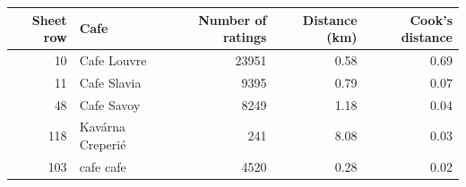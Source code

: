 \begingroup\footnotesize
\begin{tabular}{rlrrr}
  \toprule
Sheet row & Cafe & Number of ratings & Distance (km) & Cook's distance \\ 
  \midrule
 10 & Cafe Louvre & 23951 & 0.58 & 0.69 \\ 
   11 & Cafe Slavia & 9395 & 0.79 & 0.07 \\ 
   48 & Cafe Savoy & 8249 & 1.18 & 0.04 \\ 
  118 & Kavárna Creperié & 241 & 8.08 & 0.03 \\ 
  103 & cafe cafe & 4520 & 0.28 & 0.02 \\ 
   \bottomrule
\end{tabular}
\endgroup
